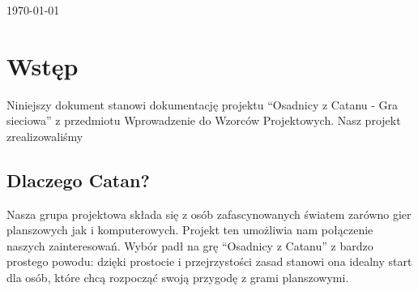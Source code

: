 \documentclass[a4paper, 11pt]{article}
\begin{document}
\begin{titlepage}
		
		
		{\large \today}\\[3cm] %
		
		
		
		
		\vfill %
		
	\end{titlepage}
	
	
	\tableofcontents
	\vfill
	\newpage	%
	
	
	
	\section{Wstęp}
	\indent
	
	Niniejszy dokument stanowi dokumentację projektu ``Osadnicy z Catanu - Gra sieciowa'' z przedmiotu Wprowadzenie do Wzorców Projektowych.
	Nasz projekt zrealizowaliśmy
	\subsection{Dlaczego Catan?}
	\indent 
	
	Nasza grupa projektowa składa się z osób zafascynowanych światem zarówno gier planszowych jak i komputerowych. Projekt ten umożliwia nam połączenie naszych zainteresowań. Wybór padł na grę ``Osadnicy z Catanu'' z bardzo prostego powodu: dzięki prostocie i przejrzystości zasad stanowi ona idealny start dla osób, które chcą rozpocząć swoją przygodę z grami planszowymi. \\ 
	
\end{document}
